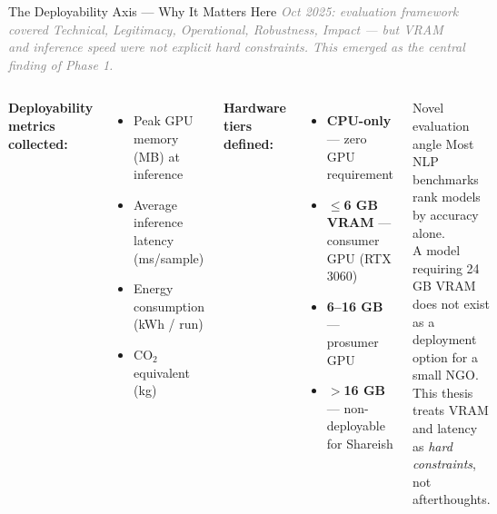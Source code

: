 \documentclass[aspectratio=169, 12pt]{beamer}
\newcommand{\good}[1]{\textcolor{okgreen}{\textbf{#1}}}
\newcommand{\bad}[1]{\textcolor{warnred}{\textbf{#1}}}
\newcommand{\warn}[1]{\textcolor{warnorange}{\textbf{#1}}}
\begin{document}
\begin{frame}[shrink=25]{The Deployability Axis — Why It Matters Here}
  \textit{\small\textcolor{gray}{Oct 2025: evaluation framework covered Technical, Legitimacy, Operational, Robustness, Impact — but VRAM and inference speed were not explicit hard constraints. This emerged as the central finding of Phase 1.}}\\[4pt]
  \begin{columns}[T]
      \small
      \textbf{Deployability metrics collected:}
      \begin{itemize}
        \item Peak GPU memory (MB) at inference
        \item Average inference latency (ms/sample)
        \item Energy consumption (kWh / run)
        \item CO$_2$ equivalent (kg)
      \end{itemize}
      \vspace{4pt}
      \textbf{Hardware tiers defined:}
      \begin{itemize}
        \item \good{CPU-only} — zero GPU requirement
        \item \good{$\leq$6 GB VRAM} — consumer GPU (RTX 3060)
        \item \warn{6–16 GB} — prosumer GPU
        \item \bad{$>$16 GB} — non-deployable for Shareish
      \end{itemize}

      \begin{alertblock}{Novel evaluation angle}
        \small
        Most NLP benchmarks rank models by accuracy alone.\\[4pt]
        \alert{A model requiring 24 GB VRAM does not exist as a deployment option for a small NGO.}\\[4pt]
        This thesis treats VRAM and latency as \emph{hard constraints}, not afterthoughts.
      \end{alertblock}
  \end{columns}
\end{frame}
\end{document}
